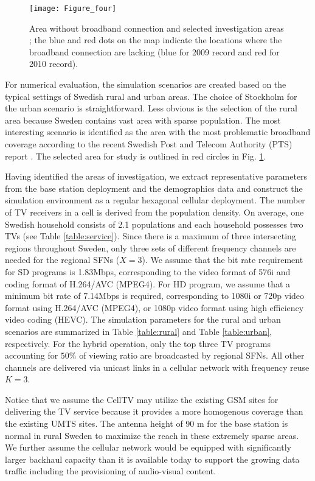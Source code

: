 \documentclass[journal]{IEEEtran}
\begin{document}
\begin{figure}[t]
  \centering
  \texttt{[image: Figure\_four]}\\
  \caption{Area without broadband connection and selected investigation areas \cite{PTS4}; the blue and red dots on the map indicate the locations where the broadband connection are lacking (blue for 2009 record and red for 2010 record).}\label{fig:Area}
\end{figure}

For numerical evaluation, the simulation scenarios are created based on the typical settings of Swedish rural and urban areas. The choice of Stockholm for the urban scenario is straightforward. Less obvious is the selection of the rural area because Sweden contains vast area with sparse population. The most interesting scenario is identified as the area with the most problematic broadband coverage according to the recent Swedish Post and Telecom Authority (PTS) report \cite{PTS4}. The selected area for study is outlined in red circles in Fig. \ref{fig:Area}.


Having identified the areas of investigation, we extract representative parameters from the base station deployment and the demographics data and construct the simulation environment as a regular hexagonal cellular deployment. The number of TV receivers in a cell is derived from the population density. On average, one Swedish household consists of 2.1 populations and each household possesses two TVs (see Table \ref{table:service}). Since there is a maximum of three intersecting regions throughout Sweden, only three sets of different frequency channels are needed for the regional SFNs ($X=3$). We assume that the bit rate requirement for SD programs is 1.83Mbps, corresponding to the video format of 576i and coding format of H.264/AVC (MPEG4). For HD program, we assume that a minimum bit rate of 7.14Mbps is required, corresponding to 1080i or 720p video format using H.264/AVC (MPEG4), or 1080p video format using high efficiency video coding (HEVC). The simulation parameters for the rural and urban scenarios are summarized in Table \ref{table:rural} and Table \ref{table:urban}, respectively. For the hybrid operation, only the top three TV programs accounting for $50\%$ of viewing ratio are broadcasted by regional SFNs. All other channels are delivered via unicast links in a cellular network with frequency reuse $K=3$.

Notice that we assume the CellTV may utilize the existing GSM sites for delivering the TV service because it provides a more homogenous coverage than the existing UMTS sites. The antenna height of 90 m for the base station is normal in rural Sweden to maximize the reach in these extremely sparse areas. We further assume the cellular network would be equipped with significantly larger backhaul capacity than it is available today to support the growing data traffic including the provisioning of audio-visual content.
\end{document}
